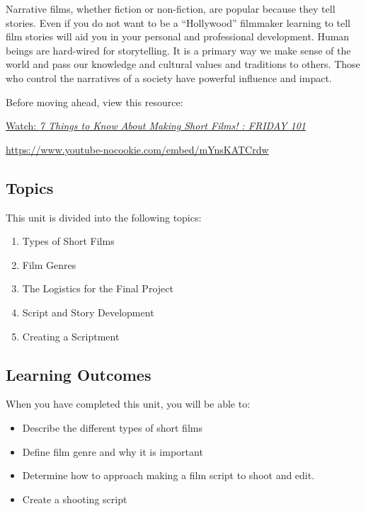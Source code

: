 \documentclass[
  letterpaper,
  DIV=11,
  numbers=noendperiod]{scrreprt}
\providecommand{\tightlist}{%
  \setlength{\itemsep}{0pt}\setlength{\parskip}{0pt}}\usepackage{longtable,booktabs,array}
\begin{document}
Narrative films, whether fiction or non-fiction, are popular because
they tell stories. Even if you do not want to be a ``Hollywood''
filmmaker learning to tell film stories will aid you in your personal
and professional development. Human beings are hard-wired for
storytelling. It is a primary way we make sense of the world and pass
our knowledge and cultural values and traditions to others. Those who
control the narratives of a society have powerful influence and impact.

Before moving ahead, view this resource:

\href{https://www.youtube.com/watch?v=mYnsKATCrdw}{Watch: \emph{7 Things
to Know About Making Short Films! : FRIDAY 101}}

\url{https://www.youtube-nocookie.com/embed/mYnsKATCrdw}

\subsection*{Topics}\label{topics-7}

This unit is divided into the following topics:

\begin{enumerate}
\def\labelenumi{\arabic{enumi}.}
\tightlist
\item
  Types of Short Films
\item
  Film Genres
\item
  The Logistics for the Final Project
\item
  Script and Story Development
\item
  Creating a Scriptment
\end{enumerate}

\subsection*{Learning Outcomes}\label{learning-outcomes-7}

When you have completed this unit, you will be able to:

\begin{itemize}
\tightlist
\item
  Describe the different types of short films
\item
  Define film genre and why it is important
\item
  Determine how to approach making a film script to shoot and edit.
\item
  Create a shooting script
\end{itemize}
\end{document}
